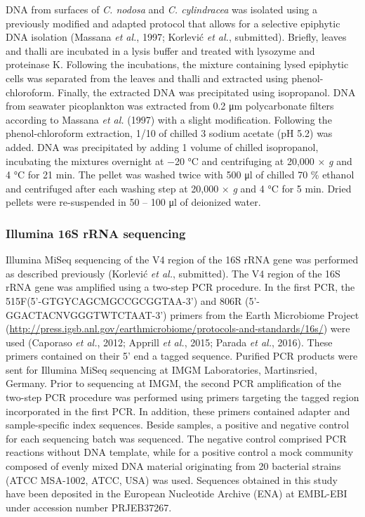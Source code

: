 \documentclass[12pt,]{article}
\begin{document}
DNA from surfaces of \emph{C. nodosa} and \emph{C. cylindracea} was
isolated using a previously modified and adapted protocol that allows
for a selective epiphytic DNA isolation (Massana \emph{et al.}, 1997;
Korlević \emph{et al.}, submitted). Briefly, leaves and thalli are
incubated in a lysis buffer and treated with lysozyme and proteinase K.
Following the incubations, the mixture containing lysed epiphytic cells
was separated from the leaves and thalli and extracted using
phenol-chloroform. Finally, the extracted DNA was precipitated using
isopropanol. DNA from seawater picoplankton was extracted from 0.2
\si{\um} polycarbonate filters according to Massana \emph{et al.} (1997)
with a slight modification. Following the phenol-chloroform extraction,
1/10 of chilled 3 \si{\Molar} sodium acetate (pH 5.2) was added. DNA was
precipitated by adding 1 volume of chilled isopropanol, incubating the
mixtures overnight at \num{-20} \si{\degreeCelsius} and centrifuging at
20,000 × \emph{g} and 4 \si{\degreeCelsius} for 21 \si{\minute}. The
pellet was washed twice with 500 \si{\ul} of chilled 70 \si{\percent}
ethanol and centrifuged after each washing step at 20,000 × \emph{g} and
4 \si{\degreeCelsius} for 5 \si{\minute}. Dried pellets were
re-suspended in 50 -- 100 \si{\ul} of deionized water.

\hypertarget{illumina-16s-rrna-sequencing}{%
\subsubsection{Illumina 16S rRNA
sequencing}\label{illumina-16s-rrna-sequencing}}

Illumina MiSeq sequencing of the V4 region of the 16S rRNA gene was
performed as described previously (Korlević \emph{et al.}, submitted).
The V4 region of the 16S rRNA gene was amplified using a two-step PCR
procedure. In the first PCR, the
515F\linebreak(5'-GTGYCAGCMGCCGCGGTAA-3') and 806R
(5'-GGACTACNVGGGTWTCTAAT-3') primers from the Earth Microbiome Project
(\url{http://press.igsb.anl.gov/earthmicrobiome/protocols-and-standards/16s/})
were used (Caporaso \emph{et al.}, 2012; Apprill \emph{et al.}, 2015;
Parada \emph{et al.}, 2016). These primers contained on their 5' end a
tagged sequence. Purified PCR products were sent for Illumina MiSeq
sequencing at IMGM Laboratories, Martinsried, Germany. Prior to
sequencing at IMGM, the second PCR amplification of the two-step PCR
procedure was performed using primers targeting the tagged region
incorporated in the first PCR. In addition, these primers contained
adapter and sample-specific index sequences. Beside samples, a positive
and negative control for each sequencing batch was sequenced. The
negative control comprised PCR reactions without DNA template, while for
a positive control a mock community composed of evenly mixed DNA
material originating from 20 bacterial strains (ATCC MSA-1002, ATCC,
USA) was used. Sequences obtained in this study have been deposited in
the European Nucleotide Archive (ENA) at EMBL-EBI under accession number
PRJEB37267.
\end{document}

